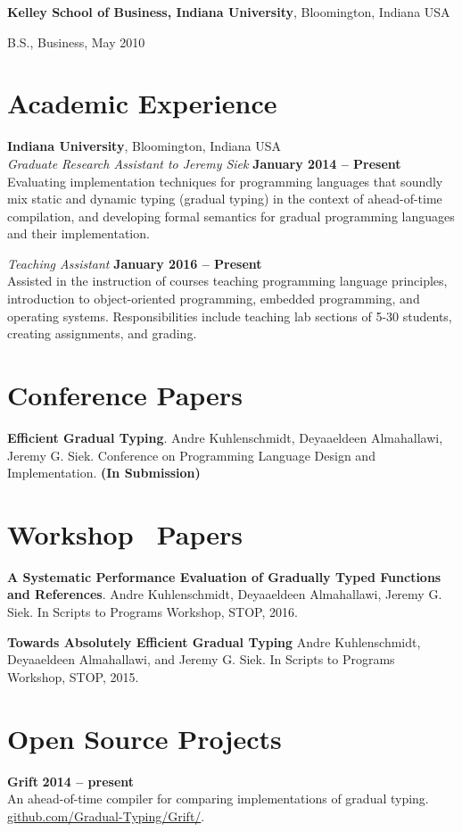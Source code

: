 \documentclass[margin,line]{res}
\newenvironment{list1}{
  \begin{list}{\ding{113}}{%
      \setlength{\itemsep}{0in}
      \setlength{\parsep}{0in} \setlength{\parskip}{0in}
      \setlength{\topsep}{0in} \setlength{\partopsep}{0in} 
      \setlength{\leftmargin}{0.17in}}}{\end{list}}
\begin{document}
\begin{resume}
{\bf Kelley School of Business, Indiana University}, Bloomington, Indiana USA\\
\vspace*{-.1in}
\begin{list1}
\item[] B.S., Business, May 2010
\end{list1}

\section{\sc Academic Experience}
{\bf Indiana University}, Bloomington, Indiana USA\\
{\em Graduate Research Assistant to Jeremy Siek} \hfill {\bf January 2014 -- Present}\\
%
Evaluating implementation techniques for programming
languages that soundly mix static and dynamic typing (gradual typing)
in the context of ahead-of-time compilation, and developing formal
semantics for gradual programming languages and their implementation.

{\em Teaching Assistant} \hfill {\bf January 2016 -- Present}\\
%
Assisted in the instruction of courses teaching programming language
principles, introduction to object-oriented programming, embedded
programming, and operating systems. Responsibilities include teaching
lab sections of 5-30 students, creating assignments, and grading.

\section{\sc Conference Papers}

{\bf Efficient Gradual Typing}.
%
Andre Kuhlenschmidt, Deyaaeldeen Almahallawi, Jeremy G. Siek.
%
Conference on Programming Language Design and Implementation.
{\bf (In Submission)}

\section{\sc Workshop \, Papers}

{\bf A Systematic Performance Evaluation of Gradually Typed Functions
  and References}.
%
Andre Kuhlenschmidt, Deyaaeldeen Almahallawi, Jeremy G. Siek.
%
In Scripts to Programs Workshop, STOP, 2016.

{\bf Towards Absolutely Efficient Gradual Typing}
%
Andre Kuhlenschmidt, Deyaaeldeen Almahallawi, and Jeremy G. Siek.
%
In Scripts to Programs Workshop, STOP, 2015.

\section{\sc Open Source Projects}

{\bf Grift} \hfill {\bf 2014 -- present}\\
%
An ahead-of-time compiler for comparing implementations of gradual
typing.\\
%
\url{github.com/Gradual-Typing/Grift/}.

\end{resume}
\end{document}
